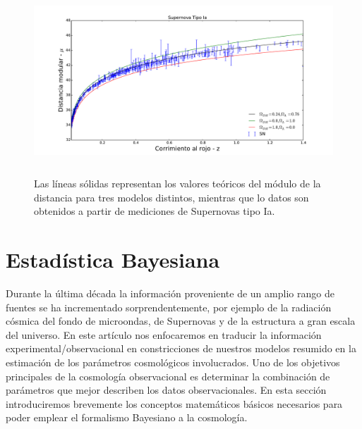 \documentclass[10.5pt,prb,
               showpacs,            %
               preprintnumbers,     %
               aps,                 %
               prl,          	    %
               letterpaper,             %
               superscriptaddress,      %
               nofootinbib,         %
               tightenlines,        %
               floats,floatfix      %
               ,usenatbib]{revtex4-1}%
\begin{document}
\begin{figure}[th]
\begin{center}
\includegraphics[trim =  0mm  0mm 0mm 0mm, clip, width=14cm, height=7cm]{SN_models.pdf} 
\end{center}
\caption[Geometries of the spacetime]
{Las l\'ineas s\'olidas representan los valores te\'oricos del m\'odulo de la distancia para tres modelos distintos,
mientras que lo datos son obtenidos a partir de mediciones de Supernovas tipo Ia.}
\label{Fig:SNs}
\end{figure}


\section{Estad\'istica Bayesiana}



Durante la \'ultima d\'ecada la informaci\'on proveniente de un amplio rango de fuentes se ha incrementado sorprendentemente,
por ejemplo de la radiaci\'on c\'osmica del fondo de microondas, de Supernovas y de la estructura a gran escala del universo.
En este art\'iculo nos enfocaremos en traducir la informaci\'on experimental/observacional en constricciones de nuestros modelos 
resumido en la estimaci\'on de los par\'ametros cosmol\'ogicos involucrados.
Uno de los objetivos principales de la cosmolog\'ia observacional es determinar 
la combinaci\'on de par\'ametros que mejor describen los datos observacionales.
En esta secci\'on introduciremos brevemente los conceptos matem\'aticos b\'asicos 
necesarios para poder emplear el formalismo Bayesiano a la cosmolog\'ia. 
\\
\end{document}
